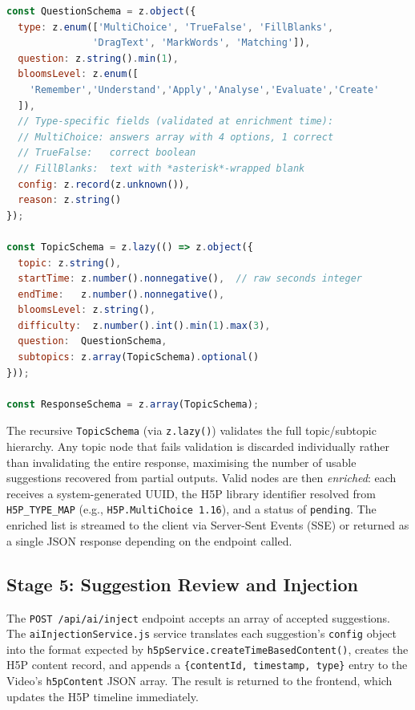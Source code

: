 \begin{lstlisting}[language=JavaScript,caption={Zod schemas for hierarchical AI output validation}]
const QuestionSchema = z.object({
  type: z.enum(['MultiChoice', 'TrueFalse', 'FillBlanks',
               'DragText', 'MarkWords', 'Matching']),
  question: z.string().min(1),
  bloomsLevel: z.enum([
    'Remember','Understand','Apply','Analyse','Evaluate','Create'
  ]),
  // Type-specific fields (validated at enrichment time):
  // MultiChoice: answers array with 4 options, 1 correct
  // TrueFalse:   correct boolean
  // FillBlanks:  text with *asterisk*-wrapped blank
  config: z.record(z.unknown()),
  reason: z.string()
});

const TopicSchema = z.lazy(() => z.object({
  topic: z.string(),
  startTime: z.number().nonnegative(),  // raw seconds integer
  endTime:   z.number().nonnegative(),
  bloomsLevel: z.string(),
  difficulty:  z.number().int().min(1).max(3),
  question:  QuestionSchema,
  subtopics: z.array(TopicSchema).optional()
}));

const ResponseSchema = z.array(TopicSchema);
\end{lstlisting}

The recursive \texttt{TopicSchema} (via \texttt{z.lazy()}) validates the
full topic/subtopic hierarchy. Any topic node that fails validation is
discarded individually rather than invalidating the entire response,
maximising the number of usable suggestions recovered from partial
outputs. Valid nodes are then \emph{enriched}: each receives a
system-generated UUID, the H5P library identifier resolved from
\texttt{H5P\_TYPE\_MAP} (e.g., \texttt{H5P.MultiChoice 1.16}), and a
status of \texttt{pending}. The enriched list is streamed to the
client via Server-Sent Events (SSE) or returned as a single JSON
response depending on the endpoint called.

\subsection{Stage 5: Suggestion Review and Injection}

The \texttt{POST /api/ai/inject} endpoint accepts an array of accepted
suggestions. The \texttt{aiInjectionService.js} service translates each
suggestion's \texttt{config} object into the format expected by
\texttt{h5pService.createTimeBasedContent()}, creates the H5P content
record, and appends a \texttt{\{contentId, timestamp, type\}} entry to the
Video's \texttt{h5pContent} JSON array. The result is returned to the
frontend, which updates the H5P timeline immediately.

